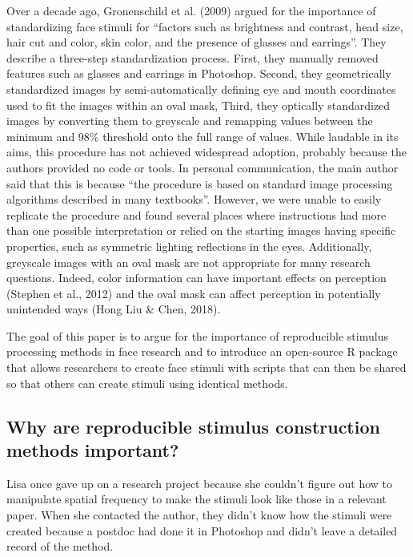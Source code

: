\documentclass[
  doc,floatsintext]{apa6}
\begin{document}
Over a decade ago, Gronenschild et al. (2009) argued for the importance of standardizing face stimuli for ``factors such as brightness and contrast, head size, hair cut and color, skin color, and the presence of glasses and earrings''. They describe a three-step standardization process. First, they manually removed features such as glasses and earrings in Photoshop. Second, they geometrically standardized images by semi-automatically defining eye and mouth coordinates used to fit the images within an oval mask, Third, they optically standardized images by converting them to greyscale and remapping values between the minimum and 98\% threshold onto the full range of values. While laudable in its aims, this procedure has not achieved widespread adoption, probably because the authors provided no code or tools. In personal communication, the main author said that this is because ``the procedure is based on standard image processing algorithms described in many textbooks''. However, we were unable to easily replicate the procedure and found several places where instructions had more than one possible interpretation or relied on the starting images having specific properties, such as symmetric lighting reflections in the eyes. Additionally, greyscale images with an oval mask are not appropriate for many research questions. Indeed, color information can have important effects on perception (Stephen et al., 2012) and the oval mask can affect perception in potentially unintended ways (Hong Liu \& Chen, 2018).

The goal of this paper is to argue for the importance of reproducible stimulus processing methods in face research and to introduce an open-source R package that allows researchers to create face stimuli with scripts that can then be shared so that others can create stimuli using identical methods.

\hypertarget{why-are-reproducible-stimulus-construction-methods-important}{%
\subsection{Why are reproducible stimulus construction methods important?}\label{why-are-reproducible-stimulus-construction-methods-important}}

Lisa once gave up on a research project because she couldn't figure out how to manipulate spatial frequency to make the stimuli look like those in a relevant paper. When she contacted the author, they didn't know how the stimuli were created because a postdoc had done it in Photoshop and didn't leave a detailed record of the method.
\end{document}
